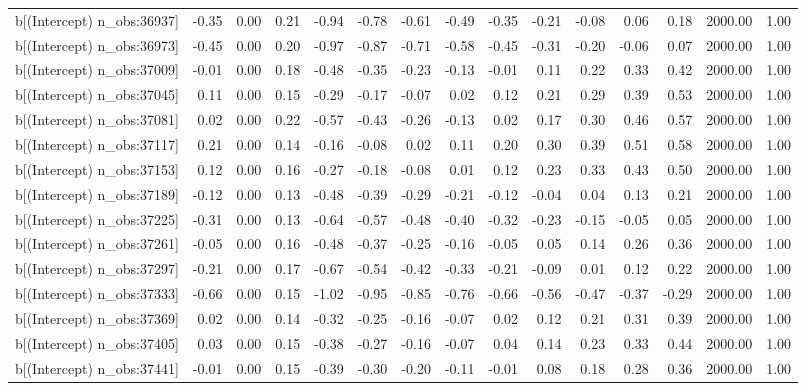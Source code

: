 \begin{table}[ht]
\begin{tabular}{rrrrrrrrrrrrrrr}
  b[(Intercept) n\_obs:36937] & -0.35 & 0.00 & 0.21 & -0.94 & -0.78 & -0.61 & -0.49 & -0.35 & -0.21 & -0.08 & 0.06 & 0.18 & 2000.00 & 1.00 \\ 
  b[(Intercept) n\_obs:36973] & -0.45 & 0.00 & 0.20 & -0.97 & -0.87 & -0.71 & -0.58 & -0.45 & -0.31 & -0.20 & -0.06 & 0.07 & 2000.00 & 1.00 \\ 
  b[(Intercept) n\_obs:37009] & -0.01 & 0.00 & 0.18 & -0.48 & -0.35 & -0.23 & -0.13 & -0.01 & 0.11 & 0.22 & 0.33 & 0.42 & 2000.00 & 1.00 \\ 
  b[(Intercept) n\_obs:37045] & 0.11 & 0.00 & 0.15 & -0.29 & -0.17 & -0.07 & 0.02 & 0.12 & 0.21 & 0.29 & 0.39 & 0.53 & 2000.00 & 1.00 \\ 
  b[(Intercept) n\_obs:37081] & 0.02 & 0.00 & 0.22 & -0.57 & -0.43 & -0.26 & -0.13 & 0.02 & 0.17 & 0.30 & 0.46 & 0.57 & 2000.00 & 1.00 \\ 
  b[(Intercept) n\_obs:37117] & 0.21 & 0.00 & 0.14 & -0.16 & -0.08 & 0.02 & 0.11 & 0.20 & 0.30 & 0.39 & 0.51 & 0.58 & 2000.00 & 1.00 \\ 
  b[(Intercept) n\_obs:37153] & 0.12 & 0.00 & 0.16 & -0.27 & -0.18 & -0.08 & 0.01 & 0.12 & 0.23 & 0.33 & 0.43 & 0.50 & 2000.00 & 1.00 \\ 
  b[(Intercept) n\_obs:37189] & -0.12 & 0.00 & 0.13 & -0.48 & -0.39 & -0.29 & -0.21 & -0.12 & -0.04 & 0.04 & 0.13 & 0.21 & 2000.00 & 1.00 \\ 
  b[(Intercept) n\_obs:37225] & -0.31 & 0.00 & 0.13 & -0.64 & -0.57 & -0.48 & -0.40 & -0.32 & -0.23 & -0.15 & -0.05 & 0.05 & 2000.00 & 1.00 \\ 
  b[(Intercept) n\_obs:37261] & -0.05 & 0.00 & 0.16 & -0.48 & -0.37 & -0.25 & -0.16 & -0.05 & 0.05 & 0.14 & 0.26 & 0.36 & 2000.00 & 1.00 \\ 
  b[(Intercept) n\_obs:37297] & -0.21 & 0.00 & 0.17 & -0.67 & -0.54 & -0.42 & -0.33 & -0.21 & -0.09 & 0.01 & 0.12 & 0.22 & 2000.00 & 1.00 \\ 
  b[(Intercept) n\_obs:37333] & -0.66 & 0.00 & 0.15 & -1.02 & -0.95 & -0.85 & -0.76 & -0.66 & -0.56 & -0.47 & -0.37 & -0.29 & 2000.00 & 1.00 \\ 
  b[(Intercept) n\_obs:37369] & 0.02 & 0.00 & 0.14 & -0.32 & -0.25 & -0.16 & -0.07 & 0.02 & 0.12 & 0.21 & 0.31 & 0.39 & 2000.00 & 1.00 \\ 
  b[(Intercept) n\_obs:37405] & 0.03 & 0.00 & 0.15 & -0.38 & -0.27 & -0.16 & -0.07 & 0.04 & 0.14 & 0.23 & 0.33 & 0.44 & 2000.00 & 1.00 \\ 
  b[(Intercept) n\_obs:37441] & -0.01 & 0.00 & 0.15 & -0.39 & -0.30 & -0.20 & -0.11 & -0.01 & 0.08 & 0.18 & 0.28 & 0.36 & 2000.00 & 1.00 \\ 

\end{tabular}
\end{table}
